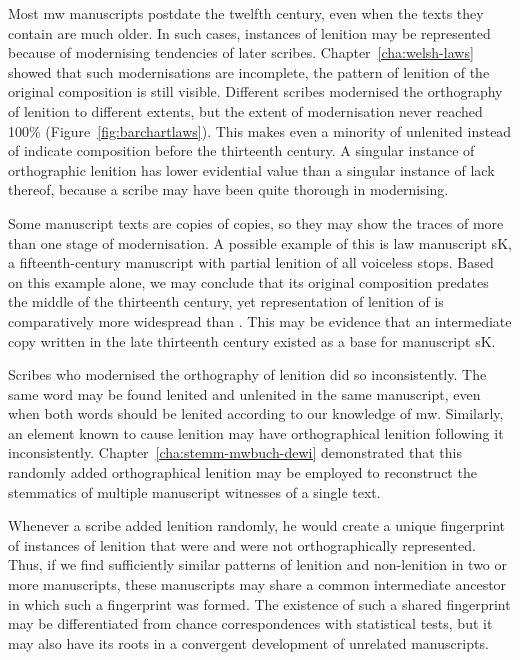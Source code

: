 Most \gls{mw} manuscripts postdate the twelfth century, even when the texts they contain are much older. In such cases, instances of lenition may be represented because of modernising tendencies of later scribes. Chapter~\ref{cha:welsh-laws} showed  that such modernisations are incomplete, \ie the pattern of lenition of the original composition is still visible. Different scribes  modernised the orthography of lenition to different extents, but the extent of modernisation never reached 100\% (Figure~\ref{fig:barchartlaws}). This makes even a minority of unlenited  instead of  indicate composition before the thirteenth century. A singular instance of orthographic lenition has lower evidential value than a singular instance of lack thereof, because a scribe may have been quite thorough in modernising.

Some manuscript texts are copies of copies, so they may show the traces of more than one stage of modernisation. A possible example of this is law manuscript \gls{sK}, a fifteenth-century manuscript with partial lenition of all voiceless stops. Based on this example alone, we may conclude that its original composition predates the middle of the thirteenth century, yet representation of lenition of  is comparatively more widespread than . This may be evidence that an intermediate copy written in the late thirteenth century existed as a base for manuscript \gls{sK}.

Scribes who modernised the orthography of lenition did so inconsistently. The same word may be found lenited and unlenited in the same manuscript, even when both words should be lenited according to our knowledge of \gls{mw}. Similarly, an element known to cause lenition may have orthographical lenition following it inconsistently. Chapter~\ref{cha:stemm-mwbuch-dewi} demonstrated that this randomly added orthographical lenition may be employed to reconstruct the stemmatics of multiple manuscript witnesses of a single text.

Whenever a scribe added lenition randomly, he would create a unique fingerprint of instances of lenition that were and were not orthographically represented. Thus, if we find sufficiently similar patterns of lenition and non-lenition in two or more manuscripts, these manuscripts may share a common intermediate ancestor in which such a fingerprint was formed. The existence of such a shared fingerprint may be differentiated from chance correspondences with statistical tests, but it may also have its roots in a convergent development of  unrelated manuscripts.

